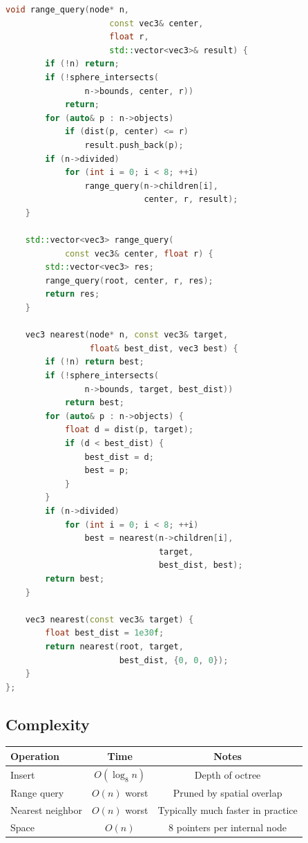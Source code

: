 \begin{lstlisting}[language=C++]
    void range_query(node* n,
                     const vec3& center,
                     float r,
                     std::vector<vec3>& result) {
        if (!n) return;
        if (!sphere_intersects(
                n->bounds, center, r))
            return;
        for (auto& p : n->objects)
            if (dist(p, center) <= r)
                result.push_back(p);
        if (n->divided)
            for (int i = 0; i < 8; ++i)
                range_query(n->children[i],
                            center, r, result);
    }

    std::vector<vec3> range_query(
            const vec3& center, float r) {
        std::vector<vec3> res;
        range_query(root, center, r, res);
        return res;
    }

    vec3 nearest(node* n, const vec3& target,
                 float& best_dist, vec3 best) {
        if (!n) return best;
        if (!sphere_intersects(
                n->bounds, target, best_dist))
            return best;
        for (auto& p : n->objects) {
            float d = dist(p, target);
            if (d < best_dist) {
                best_dist = d;
                best = p;
            }
        }
        if (n->divided)
            for (int i = 0; i < 8; ++i)
                best = nearest(n->children[i],
                               target,
                               best_dist, best);
        return best;
    }

    vec3 nearest(const vec3& target) {
        float best_dist = 1e30f;
        return nearest(root, target,
                       best_dist, {0, 0, 0});
    }
};
\end{lstlisting}

\subsection{Complexity}

\begin{center}
\begin{tabular}{lcc}
\toprule
Operation & Time & Notes \\
\midrule
Insert & $O(\log_8 n)$ & Depth of octree \\
Range query & $O(n)$ worst & Pruned by spatial overlap \\
Nearest neighbor & $O(n)$ worst & Typically much faster in practice \\
Space & $O(n)$ & $8$ pointers per internal node \\
\bottomrule
\end{tabular}
\end{center}

